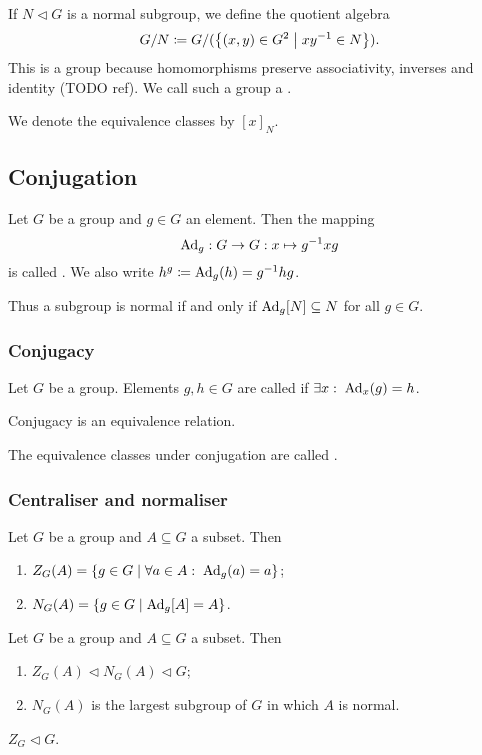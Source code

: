 If $N\lhd G$ is a normal subgroup, we define the quotient algebra
\[ G/N \defeq G/(\setbuilder{(x,y)\in G^2}{xy^{-1}\in N}). \]
This is a group because homomorphisms preserve associativity, inverses and identity (TODO ref). We call such a group a .

We denote the equivalence classes by $[x]_N$.

\subsection{Conjugation}
\begin{definition}
Let $G$ be a group and $g\in G$ an element. Then the mapping
\[ \operatorname{Ad}_g: G\to G: x\mapsto g^{-1}xg \]
is called .
We also write $h^g \coloneqq \operatorname{Ad}_g(h) = g^{-1}hg$.
\end{definition}
Thus a subgroup is normal if and only if $\operatorname{Ad}_g[N] \subseteq N$ for all $g\in G$.


\subsubsection{Conjugacy}
\begin{definition}
Let $G$ be a group. Elements $g,h\in G$ are called  if $\exists x: \; \operatorname{Ad}_x(g) = h$.
\end{definition}

\begin{proposition}
Conjugacy is an equivalence relation.
\end{proposition}
The equivalence classes under conjugation are called .


\subsubsection{Centraliser and normaliser}

\begin{lemma}
Let $G$ be a group and $A\subseteq G$ a subset. Then
\begin{enumerate}
\item $Z_G(A) = \setbuilder{g\in G}{\forall a\in A:\;\Ad_g(a) = a}$;
\item $N_G(A) = \setbuilder{g\in G}{\Ad_g[A] = A}$.
\end{enumerate}
\end{lemma}

\begin{proposition}
Let $G$ be a group and $A\subseteq G$ a subset. Then
\begin{enumerate}
\item $Z_G(A) \lhd N_G(A) \lhd G$;
\item $N_G(A)$ is the largest subgroup of $G$ in which $A$ is normal.
\end{enumerate}
\end{proposition}
\begin{corollary}
$Z_G\lhd G$.
\end{corollary}


